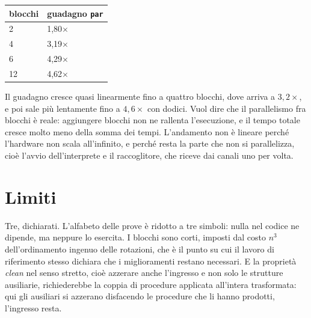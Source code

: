 \begin{center}
\begin{minipage}[c]{0.30\textwidth}
\centering
\begin{tabular}{ll}
\hline
blocchi & guadagno \texttt{par}\\
\hline
2 & 1{,}80$\times$\\
4 & 3{,}19$\times$\\
6 & 4{,}29$\times$\\
12 & 4{,}62$\times$\\
\hline
\end{tabular}
\end{minipage}
\hfill
\begin{minipage}[c]{0.65\textwidth}
\centering
{}
\end{minipage}
\end{center}

\noindent
Il guadagno cresce quasi linearmente fino a quattro blocchi, dove arriva a $3{,}2\times$, e poi sale più
lentamente fino a $4{,}6\times$ con dodici. Vuol dire che il parallelismo fra
blocchi è reale: aggiungere blocchi non ne rallenta l'esecuzione, e il tempo
totale cresce molto meno della somma dei tempi. L'andamento non è lineare perché l'hardware non scala all'infinito, e perché
resta la parte che non si parallelizza, cioè l'avvio dell'interprete e il
raccoglitore, che riceve dai canali uno per volta.

\section{Limiti}

Tre, dichiarati. L'alfabeto delle prove è ridotto a tre simboli: nulla nel
codice ne dipende, ma neppure lo esercita. I blocchi sono corti, imposti dal
costo $n^3$ dell'ordinamento ingenuo delle rotazioni, che è il punto su cui il
lavoro di riferimento stesso dichiara che i miglioramenti restano necessari. E
la proprietà \emph{clean} nel senso stretto, cioè
azzerare anche l'ingresso e non solo le strutture ausiliarie, richiederebbe la
coppia di procedure applicata all'intera trasformata: qui gli ausiliari si
azzerano disfacendo le procedure che li hanno prodotti, l'ingresso resta.

